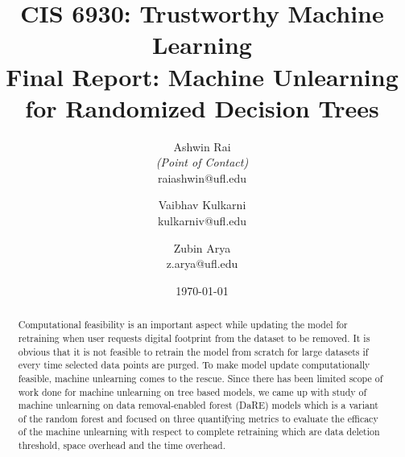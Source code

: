 \documentclass[11pt,letterpaper]{article}
\title{CIS 6930: Trustworthy Machine Learning\\
	\Large Final Report: Machine Unlearning for Randomized Decision Trees} %
\author{
        Ashwin Rai \\{\em (Point of Contact)} \\ 
        raiashwin@ufl.edu\\
        \and
        Vaibhav Kulkarni \\
        kulkarniv@ufl.edu\\
        \and
        Zubin Arya \\
        z.arya@ufl.edu\\
}
\date{\today}
\begin{document}

\maketitle


\begin{abstract}

Computational feasibility is an important aspect while updating the model for retraining when user requests digital footprint from the dataset to be removed. It is obvious that it is not feasible to retrain the model from scratch for large datasets if every time selected data points are purged. To make model update computationally feasible, machine unlearning comes to the rescue. Since there has been limited scope of work done for machine unlearning on tree based models, we came up with study of machine unlearning on data removal-enabled forest (DaRE) models which is a variant of the random forest and focused on three quantifying metrics to evaluate the efficacy of the machine unlearning with respect to complete retraining which are data deletion threshold, space overhead and the time overhead.


\end{abstract}

\vspace{-5mm} %



\tableofcontents

\clearpage




\end{document}

